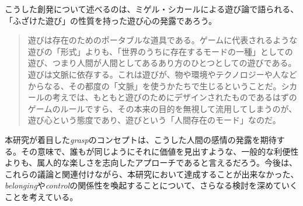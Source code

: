 こうした創発について述べるのは、ミゲル・シカールによる遊び論で語られる、「ふざけた遊び」の性質を持った遊び心の発露であろう。

\begin{quote}
  遊びは存在のためのポータブルな道具である。ゲームに代表されるような遊びの「形式」よりも、「世界のうちに存在するモードの一種」としての遊び、つまり人間が人間としてあるあり方のひとつとしての遊びである。遊びは文脈に依存する。これは遊びが、物や環境やテクノロジーや人などからなる、その都度の「文脈」を使うかたちで生じるということだ。シカールの考えでは、もともと遊びのためにデザインされたものであるはずのゲームのルールですら、その本来の目的を無視して流用してしまうのが、遊び心という態度であり、遊びという「人間存在のモード」なのだ。  
\end{quote}

本研究が着目した\textit{grasp}のコンセプトは、こうした人間の感情の発露を期待する。その意味で、誰もが同じようにそれに価値を見出すような、一般的な利便性よりも、属人的な楽しさを志向したアプローチであると言えるだろう。今後は、これらの議論と関連付けながら、本研究において達成することが出来なかった、\textit{belonging}や\textit{control}の関係性を喚起することについて、さらなる検討を深めていくことを考えている。